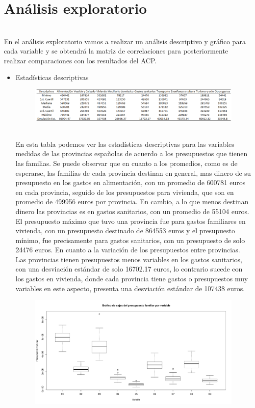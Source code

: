 \documentclass[report,oneside]{revcoles}
\begin{document}
\section{Análisis exploratorio}
~\\En el análisis exploratorio vamos a realizar un análisis descriptivo y gráfico para cada variable y se obtendrá la matriz de correlaciones para posteriormente realizar comparaciones con los resultados del ACP.
\begin{itemize}
\item Estadísticas descriptivas

\begin{figure}[h!]
  \centering
  \includegraphics[scale=0.52]{FigurasUV/desc.png}
\end{figure}

~\\En esta tabla podemos ver las estadísticas descriptivas para las variables medidas de las provincias españolas de acuerdo a los presupuestos que tienen las familias. Se puede observar que en cuanto a los promedios, como es de esperarse, las familias de cada provincia destinan en general, mas dinero de su presupuesto en los gastos en alimentación, con un promedio de 600781 euros en cada provincia, seguido de los presupuestos para vivienda, que son en promedio de 499956 euros por provincia. En cambio, a lo que menos destinan dinero las provincias es en gastos sanitarios, con un promedio de 55104 euros. El presupuesto máximo que tuvo una provincia fue para gastos familiares en vivienda, con un presupuesto destinado de 864553 euros y el presupuesto mínimo, fue precisamente para gastos sanitarios, con un presupuesto de solo 24476 euros. En cuanto a la variación de los presupuestos entre provincias. Las provincias tienen presupuestos menos variables en los gastos sanitarios, con una desviación estándar de solo 16702.17 euros, lo contrario sucede con los gastos en vivienda, donde cada provincia tiene gastos o presupuestos muy variables en este aspecto, presenta una desviación estándar de 107438 euros.
\begin{figure}[h!]
  \centering
  \includegraphics[scale=0.45]{FigurasUV/cajas.pdf}
\end{figure}


\end{itemize}
\end{document}
